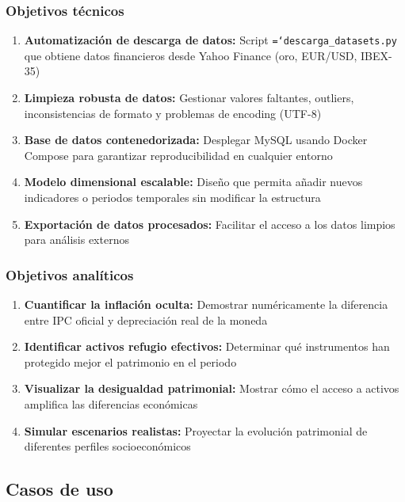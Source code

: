 \documentclass{article}
\let\oldtexttt\texttt  %
\renewcommand{\texttt}[1]{{\footnotesize\oldtexttt{\hyphenchar\font=`\-#1}}}  %
\begin{document}
\subsubsection{Objetivos t\'ecnicos}

\begin{enumerate}
    \item \textbf{Automatizaci\'on de descarga de datos:} Script \texttt{descarga\_datasets.py} que obtiene datos financieros desde Yahoo Finance (oro, EUR/USD, IBEX-35)
    \item \textbf{Limpieza robusta de datos:} Gestionar valores faltantes, outliers, inconsistencias de formato y problemas de encoding (UTF-8)
    \item \textbf{Base de datos contenedorizada:} Desplegar MySQL usando Docker Compose para garantizar reproducibilidad en cualquier entorno
    \item \textbf{Modelo dimensional escalable:} Dise\~no que permita a\~nadir nuevos indicadores o periodos temporales sin modificar la estructura
    \item \textbf{Exportaci\'on de datos procesados:} Facilitar el acceso a los datos limpios para an\'alisis externos
\end{enumerate}

\subsubsection{Objetivos anal\'iticos}

\begin{enumerate}
    \item \textbf{Cuantificar la inflaci\'on oculta:} Demostrar num\'ericamente la diferencia entre IPC oficial y depreciaci\'on real de la moneda
    \item \textbf{Identificar activos refugio efectivos:} Determinar qu\'e instrumentos han protegido mejor el patrimonio en el periodo
    \item \textbf{Visualizar la desigualdad patrimonial:} Mostrar c\'omo el acceso a activos amplifica las diferencias econ\'omicas
    \item \textbf{Simular escenarios realistas:} Proyectar la evoluci\'on patrimonial de diferentes perfiles socioecon\'omicos
\end{enumerate}

\subsection{Casos de uso}
\end{document}
